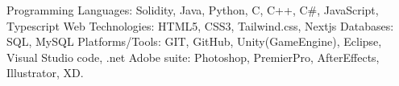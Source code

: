 


  \begin{cvskills}
    \cvskill
      {Programming Languages:}
      {Solidity, Java, Python, C, C++, C\#, JavaScript, Typescript}
     \cvskill
       {Web Technologies:}  
        {HTML5, CSS3, Tailwind.css, Nextjs}
     \cvskill
        {Databases:}  
        {SQL, MySQL}
      \cvskill
         {Platforms/Tools:}  
         {GIT, GitHub, Unity(GameEngine), Eclipse, Visual Studio code, .net \newline Adobe suite: Photoshop, PremierPro, AfterEffects, Illustrator, XD.}
      
     \end{cvskills}
    
\begin{cvparagraph}


\end{cvparagraph}
